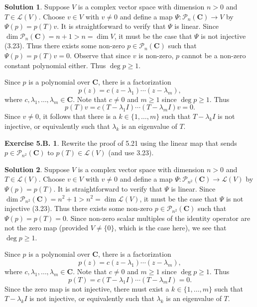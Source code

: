 \documentclass[12pt]{article}
\theoremstyle{definition}
\theoremstyle{exercise}
\newtheorem{exercise}{Exercise 5.B.}
\theoremstyle{solution}
\newtheorem*{solution}{Solution}
\newcommand{\poly}{\mathcal{P}}
\newcommand{\lmap}{\mathcal{L}}
\newcommand{\C}{\mathbf{C}}
\begin{document}
\begin{solution}
    Suppose \( V \) is a complex vector space with dimension \( n > 0 \) and \( T \in \lmap(V) \). Choose \( v \in V \) with \( v \neq 0 \) and define a map \( \Psi : \poly_n(\C) \to V \) by \( \Psi(p) = p(T)v \). It is straightforward to verify that \( \Psi \) is linear. Since \( \dim \poly_n(\C) = n + 1 > n = \dim V \), it must be the case that \( \Psi \) is not injective (3.23). Thus there exists some non-zero \( p \in \poly_n(\C) \) such that \( \Psi(p) = p(T)v = 0 \). Observe that since \( v \) is non-zero, \( p \) cannot be a non-zero constant polynomial either. Thus \( \deg p \geq 1 \).
    
    Since \( p \) is a polynomial over \( \C \), there is a factorization
    \[
        p(z) = c(z - \lambda_1) \cdots (z - \lambda_m),
    \]
    where \( c, \lambda_1, \ldots, \lambda_m \in \C \). Note that \( c \neq 0 \) and \( m \geq 1 \) since \( \deg p \geq 1 \). Thus
    \[
        p(T)v = c(T - \lambda_1 I) \cdots (T - \lambda_m I)v = 0.
    \]
    Since \( v \neq 0 \), it follows that there is a \( k \in \{ 1, \ldots, m \} \) such that \( T - \lambda_k I \) is not injective, or equivalently such that \( \lambda_k \) is an eigenvalue of \( T \).
\end{solution}

\begin{exercise}
\label{ex:17}
    Rewrite the proof of 5.21 using the linear map that sends \( p \in \poly_{n^2}(\C) \) to \( p(T) \in \lmap(V) \) (and use 3.23).
\end{exercise}

\begin{solution}
    Suppose \( V \) is a complex vector space with dimension \( n > 0 \) and \( T \in \lmap(V) \). Choose \( v \in V \) with \( v \neq 0 \) and define a map \( \Psi : \poly_{n^2}(\C) \to \lmap(V) \) by \( \Psi(p) = p(T) \). It is straightforward to verify that \( \Psi \) is linear. Since \( \dim \poly_{n^2}(\C) = n^2 + 1 > n^2 = \dim \lmap(V) \), it must be the case that \( \Psi \) is not injective (3.23). Thus there exists some non-zero \( p \in \poly_{n^2}(\C) \) such that \( \Psi(p) = p(T) = 0 \). Since non-zero scalar multiples of the identity operator are not the zero map (provided \( V \neq \{ 0 \} \), which is the case here), we see that \( \deg p \geq 1 \).

    Since \( p \) is a polynomial over \( \C \), there is a factorization
    \[
        p(z) = c(z - \lambda_1) \cdots (z - \lambda_m),
    \]
    where \( c, \lambda_1, \ldots, \lambda_m \in \C \). Note that \( c \neq 0 \) and \( m \geq 1 \) since \( \deg p \geq 1 \). Thus
    \[
        p(T) = c(T - \lambda_1 I) \cdots (T - \lambda_m I) = 0.
    \]
    Since the zero map is not injective, there must exist a \( k \in \{ 1, \ldots, m \} \) such that \( T - \lambda_k I \) is not injective, or equivalently such that \( \lambda_k \) is an eigenvalue of \( T \).
\end{solution}
\end{document}
